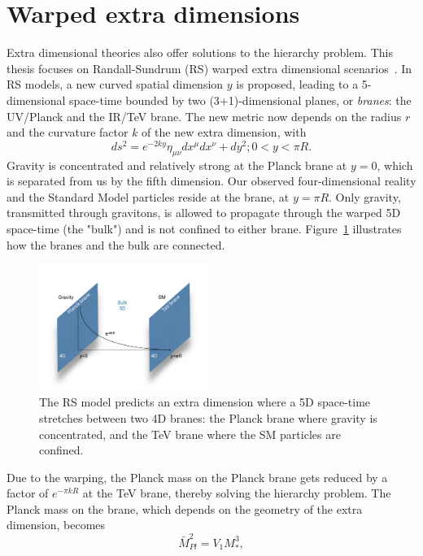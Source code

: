 \section{Warped extra dimensions}
\label{sec:theory:wed}
Extra dimensional theories also offer solutions to the hierarchy problem. This thesis focuses on Randall-Sundrum (RS) warped extra dimensional scenarios~\cite{PhysRevLett.83.3370}. In RS models, a new curved spatial dimension $y$ is proposed, leading to a 5-dimensional space-time bounded by two (3+1)-dimensional planes, or \emph{branes}: the UV/Planck and the IR/TeV brane. The new metric now depends on the radius $r$ and the curvature factor $k$ of the new extra dimension, with
\begin{equation}
  ds^2=e^{-2ky}\eta_{\mu\nu}dx^{\mu}dx^{\nu}+dy^2; 0 < y < \pi R.
\end{equation}
Gravity is concentrated and relatively strong at the Planck brane at $y=0$, which is separated from us by the fifth dimension. Our observed four-dimensional reality and the Standard Model particles reside at the \TeV brane, at $y=\pi R$. Only gravity, transmitted through gravitons, is allowed to propagate through the warped 5D space-time (the "bulk") and is not confined to either brane. Figure~\ref{fig:theory:rs1} illustrates how the branes and the bulk are connected.
\begin{figure}[h!]
\centering
\includegraphics[width=0.49\textwidth]{figures/theory/rs1.pdf}
\caption{The RS model predicts an extra dimension where a 5D space-time stretches between two 4D branes: the Planck brane where gravity is concentrated, and the TeV brane where the SM particles are confined.}
\label{fig:theory:rs1}
\end{figure}
 Due to the warping, the Planck mass on the Planck brane gets reduced by a factor of $e^{-\pi kR}$ at the TeV brane, thereby solving the hierarchy problem. The Planck mass on the \TeV brane, which depends on the geometry of the extra dimension, becomes
\begin{equation}
  \bar{M}_{Pl}^2=V_1M_*^3,
  \end{equation} 
